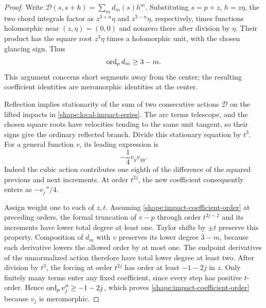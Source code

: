 \begin{proof}
Write \(\mathcal D(s,s+h)=\sum_m d_m(s)h^m\). Substituting
\(s=p+z\), \(h=z\eta\), the two chord integrals factor as
\(z^{3+n}\eta\) and \(z^{3-n}\eta\), respectively, times functions
holomorphic near \((z,\eta)=(0,0)\) and nonzero there after division by
\(\eta\). Their product has the square root \(z^3\eta\) times a
holomorphic unit, with the chosen glancing sign. Thus
\begin{equation}
 \operatorname{ord}_p d_m\geq3-m.
 \label{shape:action-coefficient-order}
\end{equation}
This argument concerns short segments away from the center; the
resulting coefficient identities are meromorphic identities at the
center.

Reflection implies stationarity of the sum of two consecutive actions
\(\mathcal D\) on the lifted impacts in
\eqref{shape:local-impact-series}. The arc terms telescope, and the
chosen square roots have velocities tending to the same unit tangent,
so their signs give the ordinary reflected branch. Divide this
stationary equation by \(t^3\). For a general function \(v\), its
leading expression is
\[
 -\frac14v_yv_{yy}.
\]
Indeed the cubic action contributes one eighth of the difference of
the squared previous and next increments. At order \(t^{2j}\), the new
coefficient consequently enters as \(-v_j''/4\).

Assign weight one to each of \(z,t\). Assuming
\eqref{shape:impact-coefficient-order} at preceding orders, the formal
truncation of \(v-p\) through order \(t^{2j-2}\) and its increments
have lower total degree at least one.
Taylor shifts by \(\pm t\) preserve this property. Composition of
\(d_m\) with \(v\) preserves its lower degree \(3-m\), because each
derivative lowers the allowed order by at most one. The endpoint
derivatives of the unnormalized action therefore have total lower
degree at least two. After division by \(t^3\), the forcing at order
\(t^{2j}\) has order at least \(-1-2j\) in \(z\). Only finitely many
terms enter any fixed coefficient, since every step has positive
\(t\)-order. Hence \(\operatorname{ord}_p v_j''\geq-1-2j\), which proves
\eqref{shape:impact-coefficient-order} because \(v_j\) is meromorphic.


\end{proof}
